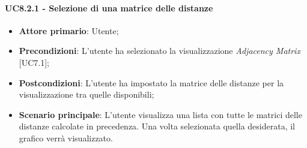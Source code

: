 \paragraph{UC8.2.1 - Selezione di una matrice delle distanze}
\begin{itemize}
	\item \textbf{Attore primario}: Utente;
	\item \textbf{Precondizioni}: L'utente ha selezionato la visualizzazione \textit{Adjacency Matrix} [UC7.1];
	\item \textbf{Postcondizioni}: L'utente ha impostato la matrice delle distanze per la visualizzazione tra quelle disponibili;
	
	\item \textbf{Scenario principale}: L'utente visualizza una lista con tutte le matrici delle distanze calcolate in precedenza. Una volta selezionata quella desiderata, il grafico verrà visualizzato.
\end{itemize}